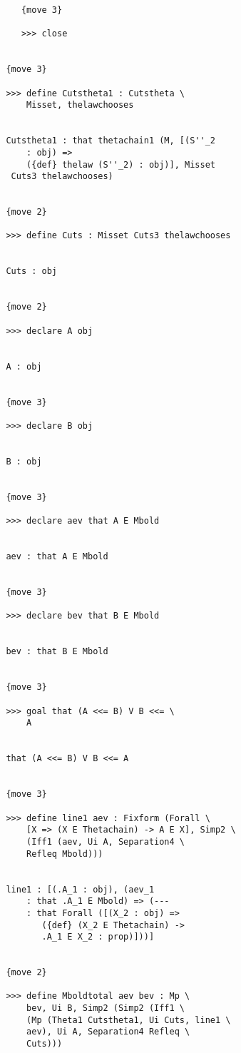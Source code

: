 \documentclass[12pt]{article}
\begin{document}
\begin{verbatim}
            {move 3}

            >>> close


         {move 3}

         >>> define Cutstheta1 : Cutstheta \
             Misset, thelawchooses


         Cutstheta1 : that thetachain1 (M, [(S''_2 
             : obj) => 
             ({def} thelaw (S''_2) : obj)], Misset 
          Cuts3 thelawchooses)


         {move 2}

         >>> define Cuts : Misset Cuts3 thelawchooses


         Cuts : obj


         {move 2}

         >>> declare A obj


         A : obj


         {move 3}

         >>> declare B obj


         B : obj


         {move 3}

         >>> declare aev that A E Mbold


         aev : that A E Mbold


         {move 3}

         >>> declare bev that B E Mbold


         bev : that B E Mbold


         {move 3}

         >>> goal that (A <<= B) V B <<= \
             A


         that (A <<= B) V B <<= A


         {move 3}

         >>> define line1 aev : Fixform (Forall \
             [X => (X E Thetachain) -> A E X], Simp2 \
             (Iff1 (aev, Ui A, Separation4 \
             Refleq Mbold)))


         line1 : [(.A_1 : obj), (aev_1 
             : that .A_1 E Mbold) => (--- 
             : that Forall ([(X_2 : obj) => 
                ({def} (X_2 E Thetachain) -> 
                .A_1 E X_2 : prop)]))]


         {move 2}

         >>> define Mboldtotal aev bev : Mp \
             bev, Ui B, Simp2 (Simp2 (Iff1 \
             (Mp (Theta1 Cutstheta1, Ui Cuts, line1 \
             aev), Ui A, Separation4 Refleq \
             Cuts)))



\end{verbatim}
\end{document}

